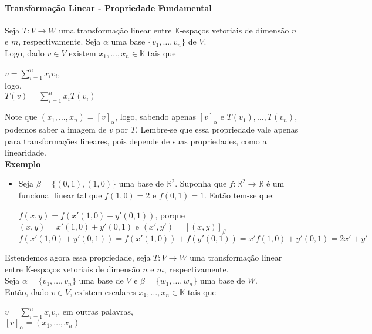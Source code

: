 \documentclass[12pt]{article}
\begin{document}
\paragraph{Transformação Linear - Propriedade Fundamental\\}
	Seja $T: V \rightarrow W$ uma transformação linear entre $\mathbb{K}$-espaços vetoriais de dimensão $n$ e $m$, respectivamente. Seja $\alpha$ uma base $\lbrace v_1, \dots, v_n \rbrace$ de $V$.\\[5pt]
	Logo, dado $v \in V$ existem $x_1, \dots, x_n \in \mathbb{K}$ tais que
	\begin{center}
		$v = \sum\limits^n_{i = 1}x_i v_i$,\\[5pt] logo,\\[5pt]
		$T(v) = \sum\limits^n_{i=1} x_i T(v_i)$
	\end{center}
	Note que $(x_1, \dots, x_n) = [v]_\alpha$, logo, sabendo apenas $[v]_\alpha$ e $T(v_1), \dots, T(v_n)$, podemos saber a imagem de $v$ por $T$. Lembre-se que essa propriedade vale apenas para transformações lineares, pois depende de suas propriedades, como a linearidade.\\[10pt]
	\textbf{Exemplo}
	\begin{itemize}
	\item Seja $\beta = \lbrace (0,1), (1,0) \rbrace$ uma base de $\mathbb{R}^2$. Suponha que $f: \mathbb{R}^2 \rightarrow \mathbb{R}$ é um funcional linear tal que $f(1,0) = 2$ e $f(0,1) = 1$. Então tem-se que:
		\begin{center}
			$f(x,y) = f(x'(1,0) + y'(0,1))$, porque $(x,y) = x'(1,0) + y'(0,1)$ e $(x',y') = [(x,y)]_\beta$ \\[10pt]
			$f(x'(1,0) + y'(0,1)) = f(x'(1,0)) + f(y'(0,1)) = x'f(1,0) + y'(0,1) = 2x' + y'$ 
		\end{center}	 
	\end{itemize}
	Estendemos agora essa propriedade, seja $T: V \rightarrow W$ uma transformação linear entre $\mathbb{K}$-espaços vetoriais de dimensão $n$ e $m$, respectivamente.\\
	Seja $\alpha = \lbrace v_1, \dots, v_n \rbrace$ uma base de $V$ e $\beta = \lbrace w_1, \dots, w_n \rbrace$ uma base de $W$.\\
	Então, dado $v \in V$, existem escalares $x_1, \dots, x_n \in \mathbb{K}$ tais que
	\begin{center}
		$v = \sum\limits_{i=1}^n x_i v_i$, em outras palavras,\\[5pt]
		$[v]_\alpha = (x_1, \dots, x_n)$
	\end{center}
\end{document}
